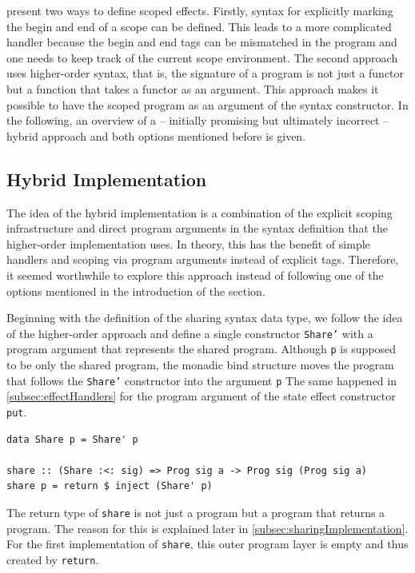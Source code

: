 \documentclass[a4paper, 11pt, fleqn, twoside]{scrreprt}
\newcommand{\hinl}[1]{\texttt{#1}}
\begin{document}
\citet{wu2014effect} present two ways to define scoped effects.
Firstly, syntax for explicitly marking the begin and end of a scope can be defined.
This leads to a more complicated handler because the begin and end tags can be mismatched in the program and one needs to keep track of the current scope environment.
The second approach uses higher-order syntax, that is, the signature of a program is not just a functor but a function that takes a functor as an argument.
This approach makes it possible to have the scoped program as an argument of the syntax constructor.
In the following, an overview of a  -- initially promising but ultimately incorrect  -- hybrid approach and both options mentioned before is given.

\subsection{Hybrid Implementation}

The idea of the hybrid implementation is a combination of the explicit scoping infrastructure and direct program arguments in the syntax definition that the higher-order implementation uses.
In theory, this has the benefit of simple handlers and scoping via program arguments instead of explicit tags.
Therefore, it seemed worthwhile to explore this approach instead of following one of the options mentioned in the introduction of the section.

Beginning with the definition of the sharing syntax data type, we follow the idea of the higher-order approach and define a single constructor \hinl{Share'} with a program argument that represents the shared program.
Although \hinl{p} is supposed to be only the shared program, the monadic bind structure moves the program that follows the \hinl{Share'} constructor into the argument \hinl{p}
The same happened in \autoref{subsec:effectHandlers} for the program argument of the state effect constructor \hinl{put}.

\begin{verbatim}
data Share p = Share' p

share :: (Share :<: sig) => Prog sig a -> Prog sig (Prog sig a)
share p = return $ inject (Share' p)
\end{verbatim}

The return type of \hinl{share} is not just a program but a program that returns a program.
The reason for this is explained later in \autoref{subsec:sharingImplementation}.
For the first implementation of \hinl{share}, this outer program layer is empty and thus created by \hinl{return}.
\end{document}
